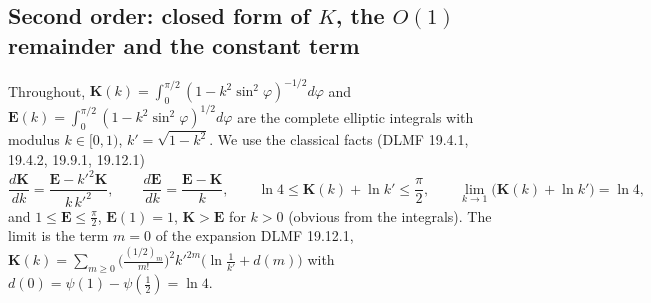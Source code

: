 \documentclass[11pt,a4paper]{article}
\theoremstyle{plain}
\theoremstyle{definition}
\numberwithin{equation}{section}
\begin{document}
\subsection{Second order: closed form of $K$, the $O(1)$ remainder and the constant term}\label{sec:d3second}

Throughout, $\mathbf K(k)=\int_0^{\pi/2}(1-k^2\sin^2\varphi)^{-1/2}d\varphi$ and $\mathbf E(k)=\int_0^{\pi/2}(1-k^2\sin^2\varphi)^{1/2}d\varphi$ are the complete elliptic integrals with modulus $k\in[0,1)$, $k'=\sqrt{1-k^2}$. We use the classical facts (DLMF 19.4.1, 19.4.2, 19.9.1, 19.12.1)
\begin{equation}\label{eq:ellfacts}
\frac{d\mathbf K}{dk}=\frac{\mathbf E-k'^2\mathbf K}{k\,k'^2},\qquad\frac{d\mathbf E}{dk}=\frac{\mathbf E-\mathbf K}{k},\qquad
\ln4\le\mathbf K(k)+\ln k'\le\frac\pi2,\qquad\lim_{k\to1}\big(\mathbf K(k)+\ln k'\big)=\ln4,
\end{equation}
and $1\le\mathbf E\le\frac\pi2$, $\mathbf E(1)=1$, $\mathbf K>\mathbf E$ for $k>0$ (obvious from the integrals). The limit is the term $m=0$ of the expansion DLMF 19.12.1, $\mathbf K(k)=\sum_{m\ge0}\big(\frac{(1/2)_m}{m!}\big)^2k'^{2m}\big(\ln\frac1{k'}+d(m)\big)$ with $d(0)=\psi(1)-\psi(\frac12)=\ln4$.
\end{document}
